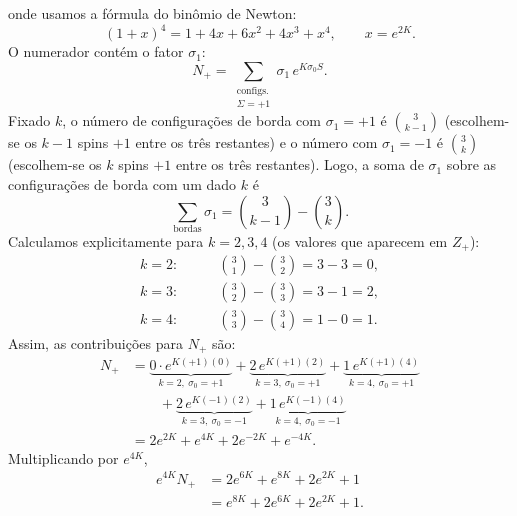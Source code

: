 \documentclass[12pt,a4paper]{article}
\begin{document}
%
onde usamos a fórmula do binômio de Newton:
%
\begin{equation}
    (1+x)^4
    =
    1+4x+6x^2+4x^3+x^4,
    \qquad
    x=e^{2K}.
\end{equation}
%
O numerador contém o fator \(\sigma_1\):
%
\begin{equation}
    N_+
    =
    \sum_{\substack{\text{configs.}\\\Sigma=+1}}
    \sigma_1\,
    e^{K\sigma_0 S}.
    \label{eq:Nplus_def_p3}
\end{equation}
%
Fixado \(k\), o número de configurações de borda com
\(\sigma_1=+1\) é \(\binom{3}{k-1}\) (escolhem-se os \(k-1\) spins
\(+1\) entre os três restantes) e o número com \(\sigma_1=-1\) é
\(\binom{3}{k}\) (escolhem-se os \(k\) spins \(+1\) entre os três
restantes). Logo, a soma de \(\sigma_1\) sobre as configurações de
borda com um dado \(k\) é
%
\begin{equation}
    \sum_{\text{bordas}}\sigma_1
    =
    \binom{3}{k-1}
    -
    \binom{3}{k}.
    \label{eq:sum_sigma1_p3}
\end{equation}
%
Calculamos explicitamente para \(k=2,3,4\) (os valores que aparecem
em \(Z_+\)):
%
\begin{align}
    k=2:&\qquad
    \binom{3}{1}-\binom{3}{2}
    =
    3-3
    =
    0,
    \label{eq:sum_k2_p3}
    \\[4pt]
    k=3:&\qquad
    \binom{3}{2}-\binom{3}{3}
    =
    3-1
    =
    2,
    \label{eq:sum_k3_p3}
    \\[4pt]
    k=4:&\qquad
    \binom{3}{3}-\binom{3}{4}
    =
    1-0
    =
    1.
    \label{eq:sum_k4_p3}
\end{align}
%
Assim, as contribuições para \(N_+\) são:
%
\begin{align}
    N_+
    &=
    \underbrace{
        0\cdot e^{K(+1)(0)}
    }_{k=2,\ \sigma_0=+1}
    +
    \underbrace{
        2\,e^{K(+1)(2)}
    }_{k=3,\ \sigma_0=+1}
    +
    \underbrace{
        1\,e^{K(+1)(4)}
    }_{k=4,\ \sigma_0=+1}
    \nonumber\\[4pt]
    &\qquad
    +
    \underbrace{
        2\,e^{K(-1)(2)}
    }_{k=3,\ \sigma_0=-1}
    +
    \underbrace{
        1\,e^{K(-1)(4)}
    }_{k=4,\ \sigma_0=-1}
    \nonumber\\[4pt]
    &=
    2e^{2K}
    +
    e^{4K}
    +
    2e^{-2K}
    +
    e^{-4K}.
    \label{eq:Nplus_p3}
\end{align}
%
Multiplicando por \(e^{4K}\),
%
\begin{align}
    e^{4K}N_+
    &=
    2e^{6K}
    +
    e^{8K}
    +
    2e^{2K}
    +
    1
    \nonumber\\[4pt]
    &=
    e^{8K}+2e^{6K}+2e^{2K}+1.
    \label{eq:Nplus_factored_p3}
\end{align}
\end{document}
